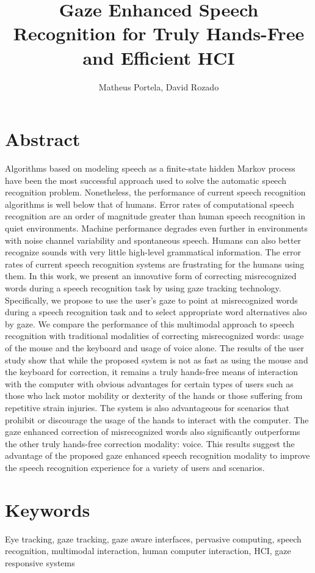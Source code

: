 \documentclass[]{article}
\title{Gaze Enhanced Speech Recognition for Truly Hands-Free and Efficient HCI}
\author{Matheus Portela, David Rozado}
\begin{document}
\maketitle

\section{Abstract}
Algorithms based on modeling speech as a finite-state hidden Markov process have been the most successful approach used
to solve the automatic speech recognition problem. Nonetheless, the performance of current speech recognition algorithms
is well below that of humans. Error rates of computational speech recognition are an order of magnitude greater than
human speech recognition in quiet environments. Machine performance degrades even further in environments with noise
channel variability and spontaneous speech. Humans can also better recognize sounds with very little high-level
grammatical information. The error rates of current speech recognition systems are frustrating for the humans using
them. In this work, we present an innovative form of correcting misrecognized words during a speech recognition task by
using gaze tracking technology. Specifically, we propose to use the user's gaze to point at misrecognized words during a
speech recognition task and to select appropriate word alternatives also by gaze. We compare  the performance of this
multimodal approach to speech recognition with traditional modalities of correcting misrecognized words: usage of the
mouse and the keyboard and usage of voice alone. The results of the user study show that while the proposed system is
not as fast as using the mouse and the keyboard for correction, it remains a truly hands-free means of interaction with the
computer with obvious advantages for certain types of users such as those who lack  motor mobility or dexterity of the
hands or those suffering from repetitive strain injuries. The system is also advantageous for scenarios that prohibit or
discourage the usage of the hands to interact with the computer. The gaze enhanced correction of misrecognized words
also significantly outperforms the other truly hands-free correction modality: voice. This results suggest the advantage
of the proposed gaze enhanced speech recognition modality to improve the speech recognition experience for a variety of
users and scenarios.


\section{Keywords}
Eye tracking, gaze tracking, gaze aware interfaces, pervasive computing, speech recognition, multimodal interaction,
human computer interaction, HCI, gaze responsive systems 
\end{document}
